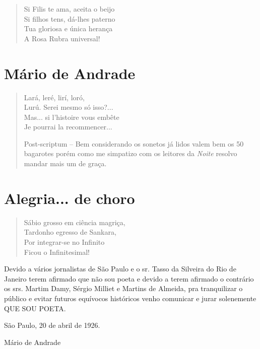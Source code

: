 \begin{verse}
Si Filis te ama, aceita o beijo\\
Si filhos tens, dá-lhes paterno\\
Tua gloriosa e única herança\\
A Rosa Rubra universal!
\end{verse}

\medskip
\section{Mário de Andrade}

\begin{verse}
Lará, leré, lirí, loró,\\
Lurú. Serei mesmo só isso?...\\
Mas... si l'histoire vous embête\\
Je pourrai la recommencer...

Post-scriptum -- Bem considerando os sonetos já lidos valem bem os 50
bagarotes porém como me simpatizo com os leitores da \emph{Noite}
resolvo mandar mais um de graça.
\end{verse}

\medskip
\section{Alegria... de choro}

\begin{verse}
Sábio grosso em ciência magriça,\\
Tardonho egresso de Sankara,\\
Por integrar-se no Infinito\\
Ficou o Infinitesimal!
\end{verse}


\centering\parbox{150pt}{
Devido a vários jornalistas de São Paulo e o sr. Tasso da Silveira do
Rio de Janeiro terem afirmado que não sou poeta e devido a terem
afirmado o contrário os srs. Martim Damy, Sérgio Milliet e Martins de
Almeida, pra tranquilizar o público e evitar futuros equívocos
históricos venho comunicar e jurar solenemente QUE SOU POETA.

\hfill{}São Paulo, 20 de abril de 1926.

\hfill{}Mário de Andrade}

